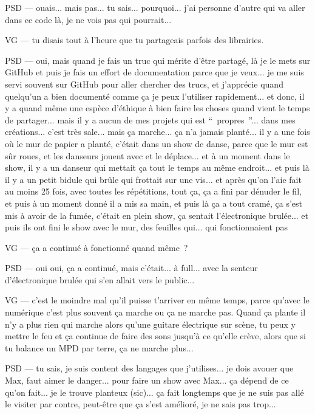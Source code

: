 PSD — ouais... mais pas... tu sais... pourquoi... j'ai personne d'autre qui va aller dans ce code là, je ne vois pas qui pourrait...

VG — tu disais tout à l'heure que tu partageais parfois des librairies.

PSD — oui, mais quand je fais un truc qui mérite d'être partagé, là je le mets sur GitHub et puis je fais un effort de documentation parce que je veux...  je me suis servi souvent sur GitHub pour aller chercher des trucs, et j'apprécie quand quelqu'un a bien documenté comme ça je peux l'utiliser rapidement... et donc, il y a quand même une espèce d'éthique à bien faire les choses quand vient le temps de partager... mais il y a aucun de mes projets qui est “ propres ”... dans mes créations... c'est très sale... mais ça marche... ça n'a jamais planté... il y a une fois où le mur de papier a planté, c'était dans un show de danse, parce que le mur est sûr roues, et les danseurs jouent avec et le déplace... et à un moment dans le show, il y a un danseur qui mettait ça tout le temps au même endroit... et puis là il y a un petit bidule qui brûle qui frottait sur une vis... et après qu'on l'aie fait au moins 25 fois, avec toutes les répétitions, tout ça, ça a fini par dénuder le fil, et puis à un moment donné il a mis sa main, et puis là ça a tout cramé, ça s'est mis à avoir de la fumée, c'était en plein show, ça sentait l'électronique brulée... et puis ils ont fini le show avec le mur, des feuilles qui... qui fonctionnaient pas 

VG — ça a continué à fonctionné quand même ?

PSD — oui oui, ça a continué, mais c'était... à full... avec la senteur d'électronique brulée qui s'en allait vers le public...

VG — c'est le moindre mal qu'il puisse t'arriver en même temps, parce qu'avec le numérique c'est plus souvent ça marche ou ça ne marche pas. Quand ça plante il n'y a plus rien qui marche alors qu'une guitare électrique sur scène, tu peux y mettre le feu et ça continue de faire des sons jusqu'à ce qu'elle crève, alors que si tu balance un MPD par terre, ça ne marche plus...

PSD — tu sais, je suis content des langages que j'utilises... je dois avouer que Max, faut aimer le danger... pour faire un show avec Max... ça dépend de ce qu'on fait... je le trouve planteux (sic)... ça fait longtemps que je ne suis pas allé le visiter par contre, peut-être que ça s'est amélioré, je ne sais pas trop...

